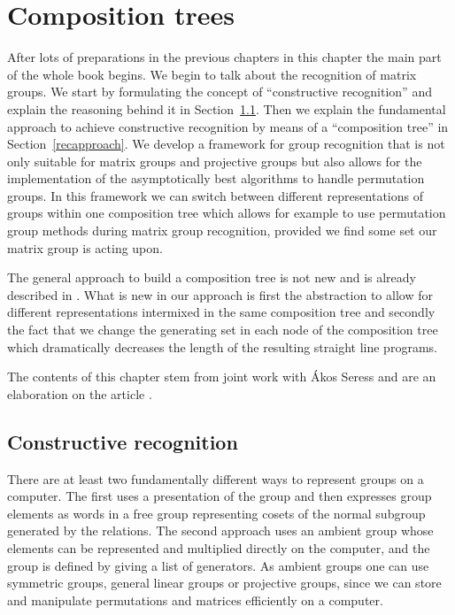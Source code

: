 
\chapter{Composition trees}

After lots of preparations in the previous chapters
in this chapter the main part of the whole book begins. We begin to talk
about the recognition of matrix groups. We start by formulating
the concept of ``constructive recognition'' and explain the reasoning
behind it in Section~\ref{constrrecog}. Then we explain the fundamental
approach to achieve
constructive recognition by means of a ``composition tree'' in
Section~\ref{recapproach}. We develop a
framework for group recognition that is not only suitable for matrix
groups and projective groups but also allows for the implementation of
the asymptotically best algorithms to handle permutation groups. In
this framework we can switch between different representations of
groups within one composition tree which allows for example to use 
permutation group methods during matrix group recognition, provided
we find some set our matrix group is acting upon.

The general approach to build a composition tree is not new and is
already described in \cite{MatGrpProj}. What is new in our approach
is first the abstraction to allow for different representations
intermixed in the same composition tree and secondly the fact that
we change the generating set in each node of the composition tree
which dramatically decreases the length of the resulting straight
line programs. 

The contents of this chapter stem from joint work with \'Akos Seress
and are an elaboration on the article \cite{AkosMaxISSAC}.

\section{Constructive recognition}
\label{constrrecog}

There are at least two fundamentally different ways to represent groups on
a computer. The first uses a presentation of the group and then
expresses group elements as words in a free group representing
cosets of the normal subgroup generated by the relations. The second
approach uses an ambient group whose elements can be represented and
multiplied directly on the computer, and the group is defined by giving
a list of generators. As ambient groups one can use symmetric groups, general
linear groups or projective groups, since we can store and manipulate
permutations and matrices efficiently on a computer.

